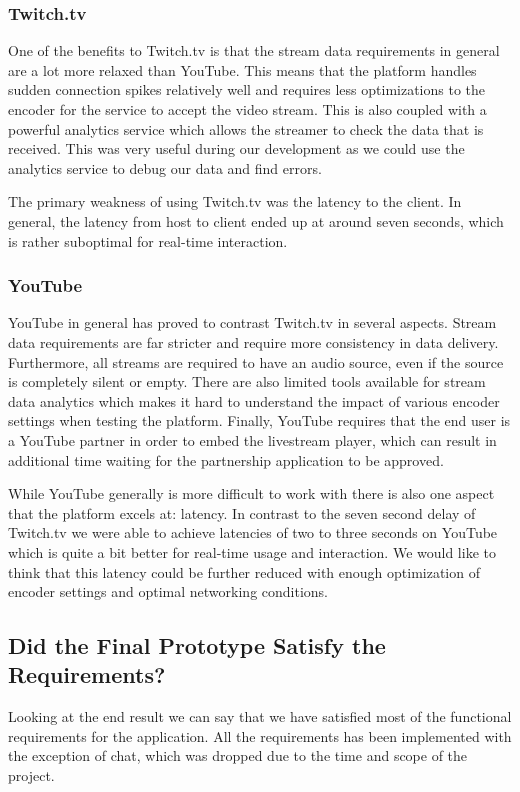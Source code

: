 \subsubsection{Twitch.tv}
One of the benefits to Twitch.tv is that the stream data requirements in general are a lot more relaxed than YouTube. This means that the platform handles sudden connection spikes relatively well and requires less optimizations to the encoder for the service to accept the video stream. This is also coupled with a powerful analytics service which allows the streamer to check the data that is received. This was very useful during our development as we could use the analytics service to debug our data and find errors.

The primary weakness of using Twitch.tv was the latency to the client. In general, the latency from host to client ended up at around seven seconds, which is rather suboptimal for real-time interaction. 

\subsubsection{YouTube}
YouTube in general has proved to contrast Twitch.tv in several aspects. Stream data requirements are far stricter and require more consistency in data delivery. Furthermore, all streams are required to have an audio source, even if the source is completely silent or empty. There are also limited tools available for stream data analytics which makes it hard to understand the impact of various encoder settings when testing the platform. Finally, YouTube requires that the end user is a YouTube partner in order to embed the livestream player, which can result in additional time waiting for the partnership application to be approved. 

While YouTube generally is more difficult to work with there is also one aspect that the platform excels at: latency. In contrast to the seven second delay of Twitch.tv we were able to achieve latencies of two to three seconds on YouTube which is quite a bit better for real-time usage and interaction. We would like to think that this latency could be further reduced with enough optimization of encoder settings and optimal networking conditions.   

\subsection{Did the Final Prototype Satisfy the Requirements?}
Looking at the end result we can say that we have satisfied most of the functional requirements for the application. All the requirements has been implemented with the exception of chat, which was dropped due to the time and scope of the project. 

